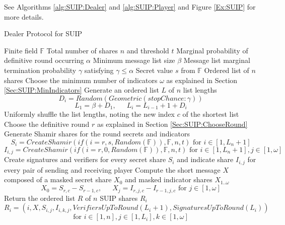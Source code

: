 \documentclass{dalcsthesis}
\begin{document}
See Algorithms \ref{alg:SUIP:Dealer} and \ref{alg:SUIP:Player} and Figure \ref{Ex:SUIP} for more details.

\begin{algorithm}
  \caption{Dealer Protocol for SUIP}
  \label{alg:SUIP:Dealer}
  \begin{algorithmic}
    \INPUT Finite field $\mathbb{F}$
    \INPUT Total number of shares $n$ and threshold $t$
    \INPUT Marginal probability of definitive round occurring $\alpha$
    \INPUT Minimum message list size $\beta$
    \INPUT Message list marginal termination probability $\gamma$ satisfying $\gamma \leq \alpha$
    \INPUT Secret value $s$ from $\mathbb{F}$
    \OUTPUT Ordered list of $n$ shares
    \STATE Choose the minimum number of indicators $\omega$ as explained in Section \ref{Sec:SUIP:MinIndicators}
    \STATE Generate an ordered list $L$ of $n$ list lengths
    	$$D_i = Random(Geometric(stopChance: \gamma))$$
    	$$L_1 = \beta + D_1 \text{, } \text{ } \text{ } L_i = L_{i-1} + 1 + D_i$$
    \STATE Uniformly shuffle the list lengths, noting the new index $c$ of the shortest list
    \STATE Choose the definitive round $r$ as explained in Section \ref{Sec:SUIP:ChooseRound}
    \STATE Generate Shamir shares for the round secrets and indicators
    	$$S_{i} = CreateShamir(if(i = r, s, Random(\mathbb{F})), \mathbb{F}, n, t) \text{ for } i \in [1, L_n+1]$$
    	$$I_{i,j} = CreateShamir(if(i = r, 0, Random(\mathbb{F})), \mathbb{F}, n, t) \text{ for } i \in [1, L_n+1], j \in [1, \omega]$$
    \STATE Create signatures and verifiers for every secret share $S_i$ and indicate share $I_{i,j}$ for every pair of sending and receiving player
    \STATE Compute the short message $X$ composed of a masked secret share $X_0$ and masked indicator shares $X_{1..\omega}$
    	$$X_0 = S_{r,c} - S_{r-1,c} \text{, } \text{ } \text{ } X_j = I_{r,j,c} - I_{r-1,j,c} \text{ for } j \in [1, \omega]$$
    \STATE Return the ordered list $R$ of $n$ SUIP shares $R_i$
    	$$R_i = (i, X, S_{i,j}, I_{i,k,j}, VerifiersUpToRound(L_i+1), SignaturesUpToRound(L_i))$$
    	$$\text{for } i \in [1, n], j \in [1, L_i], k \in [1, \omega]$$
  \end{algorithmic}
\end{algorithm}
\end{document}
